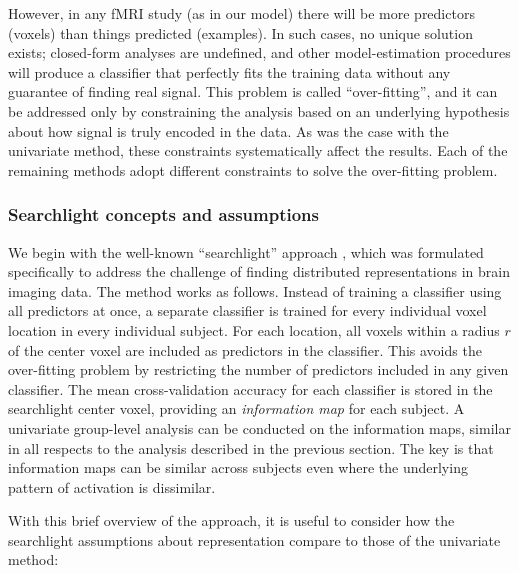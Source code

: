 However, in any fMRI study (as in our model) there will be more predictors (voxels) than things predicted (examples). In such cases, no unique solution exists; closed-form analyses are undefined, and other model-estimation procedures will produce a classifier that perfectly fits the training data without any guarantee of finding real signal.  This problem is called ``over-fitting'', and it can be addressed only by constraining the analysis based on an underlying hypothesis about how signal is truly encoded in the data. As was the case with the univariate method, these constraints systematically affect the results. Each of the remaining methods adopt different constraints to solve the over-fitting problem.

\subsubsection{Searchlight concepts and assumptions}
We begin with the well-known ``searchlight'' approach \cite{kriegeskorte_information-based_2006}, which was formulated specifically to address the challenge of finding distributed representations in brain imaging data. The method works as follows. Instead of training a classifier using all predictors at once, a separate classifier is trained for every individual voxel location in every individual subject. For each location, all voxels within a radius $r$ of the center voxel are included as predictors in the classifier. This avoids the over-fitting problem by restricting the number of predictors included in any given classifier.  The mean cross-validation accuracy for each classifier is stored in the searchlight center voxel, providing an {\em information map} for each subject. A univariate group-level analysis can be conducted on the information maps, similar in all respects to the analysis described in the previous section. The key is that information maps can be similar across subjects even where the underlying pattern of activation is dissimilar. 


With this brief overview of the approach, it is useful to consider how the searchlight assumptions about representation compare to those of the univariate method:
  
